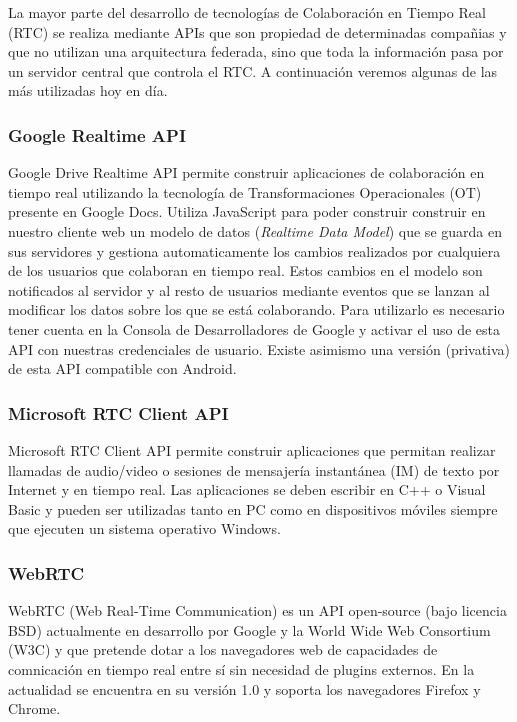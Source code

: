 	La mayor parte del desarrollo de tecnologías de Colaboración en Tiempo Real (RTC) se realiza mediante APIs que son propiedad de determinadas compañias y que no utilizan una arquitectura federada, sino que toda la información pasa por un servidor central que controla el RTC. A continuación veremos algunas de las más utilizadas hoy en día.
	
	\subsubsection{Google Realtime API}\label{sssec:googleAPI}
	
	Google Drive Realtime API \cite{ref:google_api} permite construir aplicaciones de colaboración en tiempo real utilizando la tecnología de Transformaciones Operacionales (OT) \cite{ref:how_ot_works} presente en Google Docs. Utiliza JavaScript para poder construir construir en nuestro cliente web un modelo de datos (\textit{Realtime Data Model}) que se guarda en sus servidores y gestiona automaticamente los cambios realizados por cualquiera de los usuarios que colaboran en tiempo real. Estos cambios en el modelo son notificados al servidor y al resto de usuarios mediante eventos que se lanzan al modificar los datos sobre los que se está colaborando. Para utilizarlo es necesario tener cuenta en la Consola de Desarrolladores de Google y activar el uso de esta API con nuestras credenciales de usuario. Existe asimismo una versión (privativa) de esta API compatible con Android.
	
	\subsubsection{Microsoft RTC Client API}
	
	Microsoft RTC Client API	 \cite{ref:microsoft_api} permite construir aplicaciones que permitan realizar llamadas de audio/video o sesiones de mensajería instantánea (IM) de texto por Internet y en tiempo real. Las aplicaciones se deben escribir en C++ o Visual Basic y pueden ser utilizadas tanto en PC como en dispositivos móviles siempre que ejecuten un sistema operativo Windows.
	
	\subsubsection{WebRTC}
	
	WebRTC \cite{ref:webRTC} (Web Real-Time Communication) es un API open-source (bajo licencia BSD) actualmente en desarrollo por Google y la World Wide Web Consortium (W3C) y que pretende dotar a los navegadores web de capacidades de comnicación en tiempo real entre sí sin necesidad de plugins externos. En la actualidad se encuentra en su versión 1.0 y soporta los navegadores Firefox y Chrome. 
	
